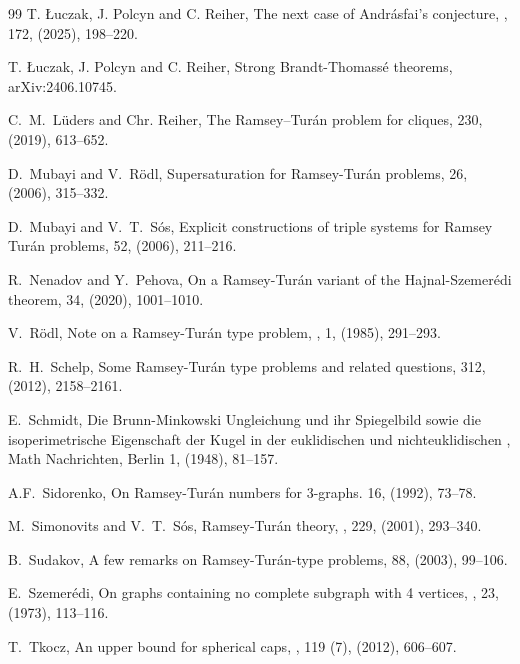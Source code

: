 \begin{thebibliography}{99}
T. \L uczak, J. Polcyn and C. Reiher,
\newblock The next case of Andr\'asfai's conjecture, 
, 172, (2025), 198--220.

T. \L uczak, J. Polcyn and C. Reiher,
\newblock Strong Brandt-Thomass\'e theorems, 
\newblock arXiv:2406.10745.

C.~M.~L\"uders and Chr. Reiher,
\newblock The Ramsey–Tur\'an problem for cliques,
 230, (2019), 613--652.

D.~Mubayi and V.~R\"odl,
\newblock Supersaturation for Ramsey-Tur\'an problems,
 26, (2006), 315--332.

D.~Mubayi and V.~T.~S\'os,
\newblock Explicit constructions of triple systems for Ramsey Tur\'an problems,
 52, (2006), 211--216.

R.~Nenadov and Y.~Pehova,
\newblock On a Ramsey-Tur\'an variant of the Hajnal-Szemer\'edi theorem,
 34, (2020), 1001--1010.

V.~R\"odl,
\newblock Note on a Ramsey-Tur\'an type problem,
, 1, (1985), 291--293.

R.~H.~Schelp,
\newblock Some Ramsey-Tur\'an type problems and related questions,
 312, (2012), 2158--2161.

E.~Schmidt, 
\newblock Die Brunn-Minkowski Ungleichung und ihr Spiegelbild sowie die isoperimetrische Eigenschaft der Kugel in der euklidischen und nichteuklidischen
, Math Nachrichten, Berlin 1, (1948), 81--157.

A.F.~Sidorenko,
\newblock On Ramsey-Tur\'an numbers for $3$-graphs.
 16, (1992), 73--78.

M.~Simonovits and V.~T.~S\'os,
\newblock Ramsey-Tur\'an theory,
, 229, (2001), 293--340.

B.~Sudakov, 
\newblock A few remarks on Ramsey-Tur\'an-type problems, 
 88, (2003), 99--106.

E.~Szemer\'edi,
\newblock On graphs containing no complete subgraph with 4 vertices,
, 23, (1973), 113--116.

T.~Tkocz,
\newblock An upper bound for spherical caps,
, 119 (7), (2012), 606--607.

\end{thebibliography}
